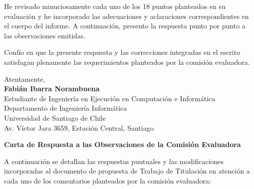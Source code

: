 He revisado minuciosamente cada uno de los 18 puntos planteados en su evaluación y he incorporado las adecuaciones y aclaraciones correspondientes en el cuerpo del informe. A continuación, presento la respuesta punto por punto a las observaciones emitidas.

Confío en que la presente respuesta y las correcciones integradas en el escrito satisfagan plenamente las requerimientos planteados por la comisión evaluadora.

\vspace{1.2cm}

\begin{flushleft}
	Atentamente,\\
	\vspace{1.5cm}
	\textbf{Fabián Ibarra Norambuena}\\
	Estudiante de Ingeniería en Ejecución en Computación e Informática\\
	Departamento de Ingeniería Informática\\
	Universidad de Santiago de Chile\\
	Av. Víctor Jara 3659, Estación Central, Santiago
\end{flushleft}

\newpage

\begin{center}
	{\Large \textbf{Carta de Respuesta a las Observaciones de la Comisión Evaluadora}}
\end{center}

\vspace{0.3cm}

\noindent
A continuación se detallan las respuestas puntuales y las modificaciones incorporadas al documento de propuesta de Trabajo de Titulación en atención a cada uno de los comentarios planteados por la comisión evaluadora:

\vspace{0.4cm}


\noindent
{}

